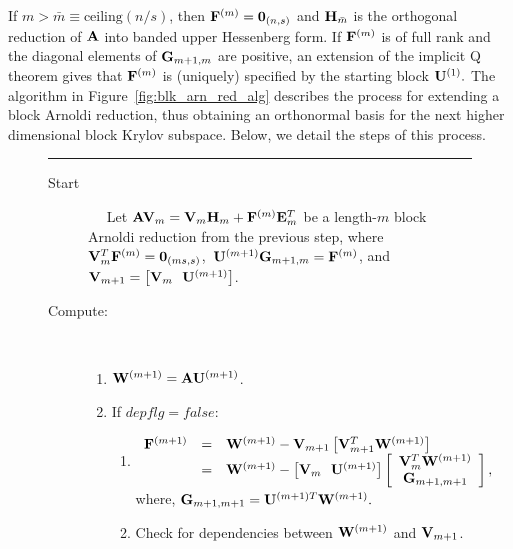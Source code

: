 \documentclass{article}
\newcommand{\bA}{{\bf A}}
\newcommand{\bE}{{\bf E}}
\newcommand{\bF}{{\bf F}}
\newcommand{\bG}{{\bf G}}
\newcommand{\bH}{{\bf H}}
\newcommand{\bU}{{\bf U}}
\newcommand{\bV}{{\bf V}}
\newcommand{\bW}{{\bf W}}
\begin{document}
If $ m > \bar{m} \equiv \mbox{ceiling}(n/s)$, then $\bF^{(m)} =
{\bf 0}_{(n,s)}$ and $\bH_{\bar{m}}$ is the orthogonal reduction
of $\bA$ into banded upper Hessenberg form.  If $\bF^{(m)}$ is of
full rank and the diagonal elements of $\bG_{m+1,m}$ are positive,
an extension of the implicit Q theorem \cite{govl:96} gives that
$\bF^{(m)}$ is (uniquely) specified by the starting block
$\bU^{(1)}.$ The algorithm in Figure~\ref{fig:blk_arn_red_alg}
describes the process for extending a block Arnoldi reduction,
thus obtaining an orthonormal basis for the next higher
dimensional block Krylov subspace. Below, we detail the steps of
this process.

{\small
\begin{figure}
\vspace{.05in} \hrule \vspace{.1in}
\begin{description}
\item[Start] ~~
Let $\bA \bV_m = \bV_m \bH_m + \bF^{(m)} \bE^T_m$ be a length-$m$
block Arnoldi reduction from the previous step, where $\bV_m^T
\bF^{(m)}= {\bf 0}_{(ms,s)}$,~$\bU^{(m+1)} \bG_{m+1,m} =
\bF^{(m)}$, and $ \bV_{m+1} = \left[ \bV_m ~~ \bU^{(m+1)}
\right]$.

\item[Compute:] ~~

\begin{enumerate}

\item $ \bW^{(m+1)} = \bA \bU^{(m+1)} $.

\item If $depflg = false$:
\begin{enumerate}
\item $ \begin{array}{rcl} \bF^{(m+1)} &=& \bW^{(m+1)} - \bV_{m+1} \left[ \bV_{m+1}^T
\bW^{(m+1)}
\right] \\
~&=& \bW^{(m+1)} - \left[ \bV_m ~~ \bU^{(m+1)} \right] \left[
\begin{array}{c} \bV_m^T \bW^{(m+1)} \\
                 \bG_{m+1,m+1}  \end{array} \right],
\end{array} $ \\
where, $\bG_{m+1,m+1} = \bU^{(m+1)T} \bW^{(m+1)}. $

\item Check for dependencies between $\bW^{(m+1)}$ and $\bV_{m+1}$.
\begin{itemize}


\end{itemize}
\end{enumerate}
\end{enumerate}
\end{description}
\end{figure}}
\end{document}
